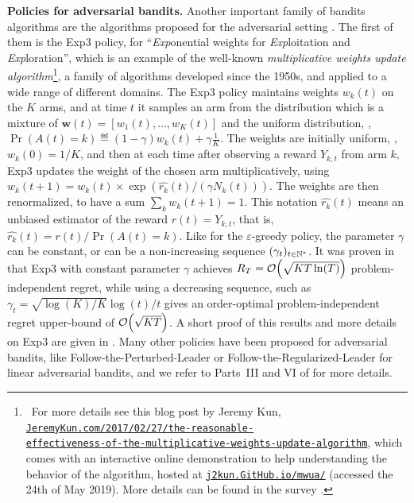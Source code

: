 \textbf{Policies for adversarial bandits.}
%
Another important family of bandits algorithms are the algorithms proposed for the adversarial setting \cite{Auer02NonStochastic}.
The first of them is the Exp3 policy, for ``\emph{Exp}onential weights for \emph{Exp}loitation and \emph{Exp}loration'',
which is an example of the well-known \emph{multiplicative weights update algorithm}\footnote{~For more details see
this blog post by Jeremy Kun, \href{https://jeremykun.com/2017/02/27/the-reasonable-effectiveness-of-the-multiplicative-weights-update-algorithm/}{\texttt{JeremyKun.com/2017/02/27/the-reasonable-}}\\
\href{https://jeremykun.com/2017/02/27/the-reasonable-effectiveness-of-the-multiplicative-weights-update-algorithm/}{\texttt{effectiveness-of-the-multiplicative-weights-update-algorithm}},
which comes with an interactive online demonstration to help understanding the behavior of the algorithm, hosted at \href{https://j2kun.github.io/mwua/index.html}{\texttt{j2kun.GitHub.io/mwua/}} (accessed the 24th of May 2019). More details can be found in the survey \cite{Arora2012multiplicative}.},
a family of algorithms developed since the 1950s, and applied to a wide range of different domains.
%
The Exp3 policy maintains weights $w_k(t)$ on the $K$ arms, and at time $t$ it samples an arm from the distribution which is a mixture of $\bm{w}(t)=[w_1(t),\dots,w_K(t)]$ and the uniform distribution, \ie,
$\Pr(A(t)=k) \eqdef (1-\gamma) w_k(t) + \gamma \frac{1}{K}$.
The weights are initially uniform, \ie, $w_k(0)=1/K$, and then at each time after observing a reward $Y_{k,t}$ from arm $k$, Exp3 updates the weight of the chosen arm multiplicatively, using $w_k(t+1) = w_k(t) \times \exp(\widehat{r_k}(t) / (\gamma N_k(t)))$. The weights are then renormalized, to have a sum $\sum_k w_k(t+1) = 1$.
This notation $\widehat{r_k}(t)$ means an unbiased estimator of the reward $r(t)=Y_{k,t}$, that is, $\widehat{r_k}(t) = r(t) / \Pr(A(t)=k)$.
%
Like for the $\varepsilon$-greedy policy, the parameter $\gamma$ can be constant, or can be a non-increasing sequence $(\gamma_t)_{t\in\mathbb{N}^*}$.
%
It was proven in \cite{Auer02NonStochastic} that Exp3 with constant parameter $\gamma$ achieves $R_T = \mathop{}\mathopen{}\mathcal{O}\mathopen{}\left(\sqrt{K T \ln(T)}\right)$ problem-independent regret,
while using a decreasing sequence, such as $\gamma_t = \sqrt{\log(K) / K} \log(t) / t$ gives an order-optimal problem-independent regret upper-bound of $\mathop{}\mathopen{}\mathcal{O}\mathopen{}\left(\sqrt{K T}\right)$.
A short proof of this results and more details on Exp3 are given in \cite{Bubeck12}.
%
Many other policies have been proposed for adversarial bandits, like Follow-the-Perturbed-Leader or Follow-the-Regularized-Leader for linear adversarial bandits,
and we refer to Parts~III and VI of \cite{LattimoreBanditAlgorithmsBook} for more details.



